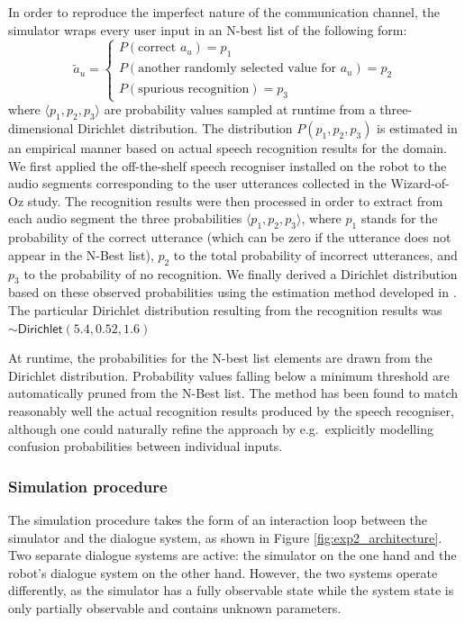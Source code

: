 In order to reproduce the imperfect nature of the communication channel, the simulator wraps every user input in an N-best list of the following form: 
\begin{equation}
\tilde{a}_u = \begin{cases} P(\text{correct } a_u) = p_1 \\ P(\text{another randomly selected value for } a_u) = p_2 \\ P(\text{spurious recognition}) = p_3 \end{cases} \nonumber
\end{equation}
where $\langle p_1, p_2, p_3 \rangle$ are probability values sampled at runtime from a three-dimensional Dirichlet distribution.  The distribution $P(p_1, p_2, p_3)$ is estimated in an empirical manner based on actual speech recognition results for the domain. We first applied the off-the-shelf speech recogniser installed on the robot to the audio segments corresponding to the user utterances collected in the Wizard-of-Oz study.  The recognition results were then processed in order to extract from each audio segment the three probabilities $\langle p_1, p_2, p_3 \rangle$, where $p_1$ stands for the probability of the correct utterance (which can be zero if the utterance does not appear in the N-Best list), $p_2$ to the total probability of incorrect utterances, and $p_3$ to the probability of no recognition. We finally derived a Dirichlet distribution based on these observed probabilities using the estimation method developed in \cite{minka2003}.  The particular Dirichlet distribution resulting from the recognition results was $\sim\mathsf{Dirichlet}(5.4, 0.52, 1.6)$

At runtime, the probabilities for the N-best list elements are drawn from the Dirichlet distribution. Probability values falling below a minimum threshold are automatically pruned from the N-Best list. The method has been found to match reasonably well the actual recognition results produced by the speech recogniser, although one could naturally refine the approach by e.g.\ explicitly modelling confusion probabilities between individual inputs. 

\subsubsection*{Simulation procedure}
The simulation procedure takes the form of an interaction loop between the simulator and the dialogue system, as shown in Figure \ref{fig:exp2_architecture}.  Two separate dialogue systems are active: the simulator on the one hand and the robot's dialogue system on the other hand.  However, the two systems operate differently, as the simulator has a fully observable state while the system state is only partially observable and contains unknown parameters. 

